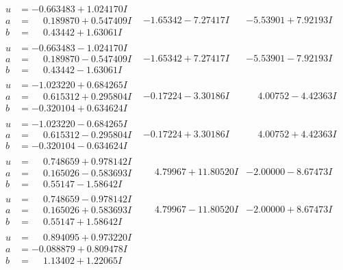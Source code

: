 \documentclass[1p]{elsarticle_modified}
\theoremstyle{definition}
\begin{document}
$$\begin{array}{c|c|c}
\begin{aligned}
u &= -0.663483 + 1.024170 I \\
a &= \phantom{-}0.189870 + 0.547409 I \\
b &= \phantom{-}0.43442 + 1.63061 I\end{aligned}
 & -1.65342 - 7.27417 I & -5.53901 + 7.92193 I \\ \hline\begin{aligned}
u &= -0.663483 - 1.024170 I \\
a &= \phantom{-}0.189870 - 0.547409 I \\
b &= \phantom{-}0.43442 - 1.63061 I\end{aligned}
 & -1.65342 + 7.27417 I & -5.53901 - 7.92193 I \\ \hline\begin{aligned}
u &= -1.023220 + 0.684265 I \\
a &= \phantom{-}0.615312 + 0.295804 I \\
b &= -0.320104 + 0.634624 I\end{aligned}
 & -0.17224 - 3.30186 I & \phantom{-}4.00752 - 4.42363 I \\ \hline\begin{aligned}
u &= -1.023220 - 0.684265 I \\
a &= \phantom{-}0.615312 - 0.295804 I \\
b &= -0.320104 - 0.634624 I\end{aligned}
 & -0.17224 + 3.30186 I & \phantom{-}4.00752 + 4.42363 I \\ \hline\begin{aligned}
u &= \phantom{-}0.748659 + 0.978142 I \\
a &= \phantom{-}0.165026 - 0.583693 I \\
b &= \phantom{-}0.55147 - 1.58642 I\end{aligned}
 & \phantom{-}4.79967 + 11.80520 I & -2.00000 - 8.67473 I \\ \hline\begin{aligned}
u &= \phantom{-}0.748659 - 0.978142 I \\
a &= \phantom{-}0.165026 + 0.583693 I \\
b &= \phantom{-}0.55147 + 1.58642 I\end{aligned}
 & \phantom{-}4.79967 - 11.80520 I & -2.00000 + 8.67473 I \\ \hline\begin{aligned}
u &= \phantom{-}0.894095 + 0.973220 I \\
a &= -0.088879 + 0.809478 I \\
b &= \phantom{-}1.13402 + 1.22065 I\end{aligned}

\end{array}$$
\end{document}
